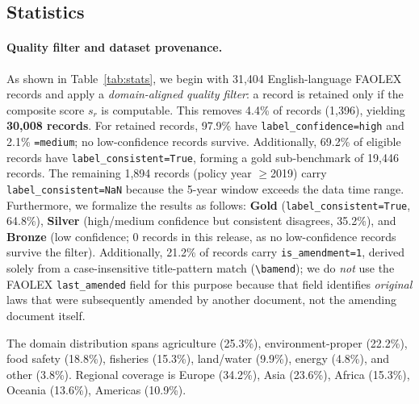 \documentclass[11pt]{article}
\begin{document}
\subsection{Statistics}
\label{sec:stats}

\paragraph{Quality filter and dataset provenance.}
As shown in Table~\ref{tab:stats}, we begin with 31{,}404 English-language FAOLEX records and apply a \textit{domain-aligned quality filter}: a record is retained only if the composite score $s_r$ is computable. This removes 4.4\% of records (1{,}396), yielding \textbf{30{,}008 records}. For retained records, 97.9\% have \texttt{label\_confidence=high} and 2.1\% \texttt{=medium}; no low-confidence records survive. Additionally, 69.2\% of eligible records have \texttt{label\_consistent=True}, forming a gold sub-benchmark of 19{,}446 records. The remaining 1{,}894 records (policy year $\ge$2019) carry \texttt{label\_consistent=NaN} because the 5-year window exceeds the data time range. Furthermore, we formalize the results as follows: \textbf{Gold} (\texttt{label\_consistent=True}, 64.8\%), \textbf{Silver} (high/medium confidence but consistent disagrees, 35.2\%), and \textbf{Bronze} (low confidence; 0 records in this release, as no low-confidence records survive the filter). Additionally, 21.2\% of records carry \texttt{is\_amendment=1},
derived solely from a case-insensitive title-pattern match (\texttt{\textbackslash bamend}); we do \emph{not} use the FAOLEX \texttt{last\_amended} field for this purpose because that field identifies \emph{original} laws that were subsequently amended by another document, not the amending document itself.  

The domain distribution spans agriculture (25.3\%), environment-proper (22.2\%), food safety (18.8\%), fisheries (15.3\%), land/water (9.9\%), energy (4.8\%), and other (3.8\%). Regional coverage is Europe (34.2\%), Asia (23.6\%), Africa (15.3\%), Oceania (13.6\%), Americas (10.9\%).
\end{document}
